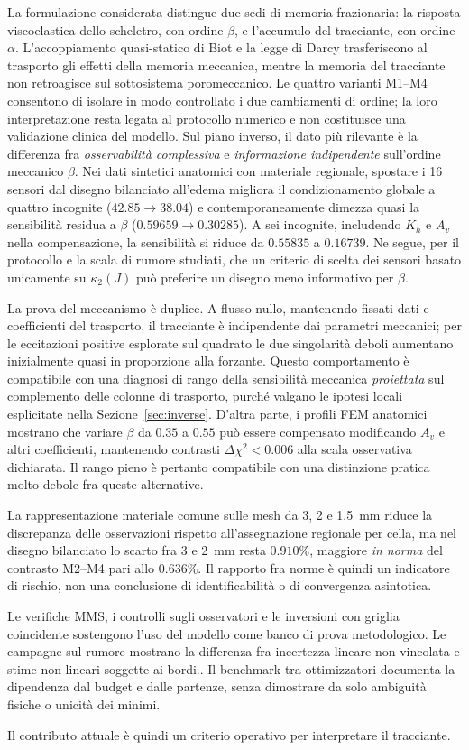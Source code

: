 La formulazione considerata distingue due sedi di memoria frazionaria: la risposta viscoelastica dello scheletro, con ordine $\beta$, e l'accumulo del tracciante, con ordine $\alpha$. L'accoppiamento quasi-statico di Biot e la legge di Darcy trasferiscono al trasporto gli effetti della memoria meccanica, mentre la memoria del tracciante non retroagisce sul sottosistema poromeccanico. Le quattro varianti M1--M4 consentono di isolare in modo controllato i due cambiamenti di ordine; la loro interpretazione resta legata al protocollo numerico e non costituisce una validazione clinica del modello. Sul piano inverso, il dato più rilevante è la differenza fra \emph{osservabilità complessiva} e \emph{informazione indipendente} sull'ordine meccanico $\beta$. Nei dati sintetici anatomici con materiale regionale, spostare i 16 sensori dal disegno bilanciato all'edema migliora il condizionamento globale a quattro incognite ($42.85\to38.04$) e contemporaneamente dimezza quasi la sensibilità residua a $\beta$ ($0.59659\to0.30285$). A sei incognite, includendo $K_h$ e $A_v$ nella compensazione, la sensibilità si riduce da $0.55835$ a $0.16739$. Ne segue, per il protocollo e la scala di rumore studiati, che un criterio di scelta dei sensori basato unicamente su $\kappa_2(J)$ può preferire un disegno meno informativo per $\beta$.

La prova del meccanismo è duplice. A flusso nullo, mantenendo fissati dati e coefficienti del trasporto, il tracciante è indipendente dai parametri meccanici; per le eccitazioni positive esplorate sul quadrato le due singolarità deboli aumentano inizialmente quasi in proporzione alla forzante. Questo comportamento è compatibile con una diagnosi di rango della sensibilità meccanica \emph{proiettata} sul complemento delle colonne di trasporto, purché valgano le ipotesi locali esplicitate nella Sezione~\ref{sec:inverse}. D'altra parte, i profili FEM anatomici mostrano che variare $\beta$ da $0.35$ a $0.55$ può essere compensato modificando $A_v$ e altri coefficienti, mantenendo contrasti $\Delta\chi^2<0.006$ alla scala osservativa dichiarata. Il rango pieno è pertanto compatibile con una distinzione pratica molto debole fra queste alternative.

La rappresentazione materiale comune sulle mesh da 3, 2 e 1.5~mm riduce la discrepanza delle osservazioni rispetto all'assegnazione regionale per cella, ma nel disegno bilanciato lo scarto fra 3 e 2~mm resta $0.910\%$, maggiore \emph{in norma} del contrasto M2--M4 pari allo $0.636\%$. Il rapporto fra norme è quindi un indicatore di rischio, non una conclusione di identificabilità o di convergenza asintotica.

Le verifiche MMS, i controlli sugli osservatori e le inversioni con griglia coincidente sostengono l'uso del modello come banco di prova metodologico. Le campagne sul rumore mostrano la differenza fra incertezza lineare non vincolata e stime non lineari soggette ai bordi.. Il benchmark tra ottimizzatori documenta la dipendenza dal budget e dalle partenze, senza dimostrare da solo ambiguità fisiche o unicità dei minimi.

Il contributo attuale è quindi un criterio operativo per interpretare il tracciante.
